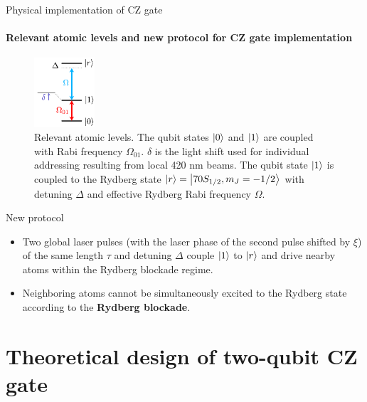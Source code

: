 \documentclass[8pt]{beamer}
\begin{document}
	\begin{frame}{Physical implementation of CZ gate}
	\framesubtitle{Relevant atomic levels and new protocol for CZ gate implementation}
	
	\begin{figure}[h!]
	    \centering
	   \includegraphics[width=0.2\textwidth]{images/physical_implementation/atomic-levels.pdf}
	    \caption{Relevant atomic levels.  The qubit states $\ket{0}$ and $\ket{1}$ are coupled with Rabi frequency $\Omega_{01}$. $\delta$ is the light shift used for individual addressing resulting from local 420 nm beams.
	    The qubit state $\ket{1}$ is coupled to the Rydberg state $\ket{r}=\ket{70 S_{1/2}, m_J=-1/2}$ with detuning $\Delta$ and effective Rydberg Rabi frequency $\Omega$.}
	    \label{fig:atomic-levels}
	\end{figure}
	
	    \begin{block}{New protocol}
            \begin{itemize}
            \item Two global laser pulses (with the laser phase of the second pulse shifted by $\xi$) of the same length $\tau$ and detuning $\Delta$ couple $\ket{1}$ to $\ket{r}$ and drive nearby atoms within the Rydberg blockade regime.
            \item Neighboring atoms cannot be simultaneously excited to the Rydberg state according to the \textbf{Rydberg blockade}.
            \end{itemize}
        \end{block}
	
	\end{frame}

	\section{Theoretical design of two-qubit CZ gate}
	
\end{document}
